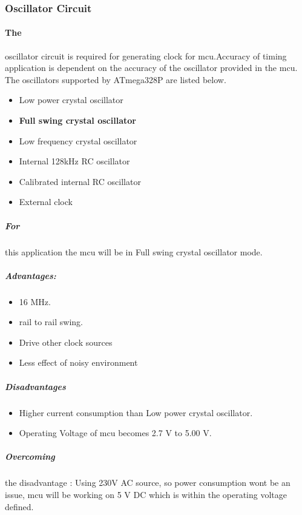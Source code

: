 

\subsubsection{Oscillator Circuit}

	\paragraph{The} oscillator circuit is required for generating clock for \gls{mcu}.Accuracy of timing application is dependent on the accuracy of the oscillator provided in the \gls{mcu}. The oscillators supported by ATmega328P are listed below.
		\begin{itemize}
			\item Low power crystal oscillator
			\item \textbf{Full swing crystal oscillator}
			\item Low frequency crystal oscillator
			\item Internal 128kHz RC oscillator
			\item Calibrated internal RC oscillator
			\item External clock
		\end{itemize}		
		
	\subparagraph{For }
	this application the \gls{mcu} will be in Full swing crystal oscillator mode.
	
	\subparagraph{\textbf{Advantages:}}
		
		\begin{itemize}
			\item 16 MHz.
			\item rail to rail swing.
			\item Drive other clock sources
			\item Less effect of noisy environment 
		\end{itemize}		
	 
	 \subparagraph{Disadvantages}
	 
	 	\begin{itemize}
	 		\item Higher current consumption than Low power crystal oscillator.
	 		\item Operating Voltage of \gls{mcu} becomes 2.7 V to 5.00 V. 
		\end{itemize}	
	
	\subparagraph{Overcoming}
	the disadvantage : Using 230V AC source, so power consumption wont be an issue, \gls{mcu} will be working on 5 V DC which is within the operating voltage defined. 	   	  
		
